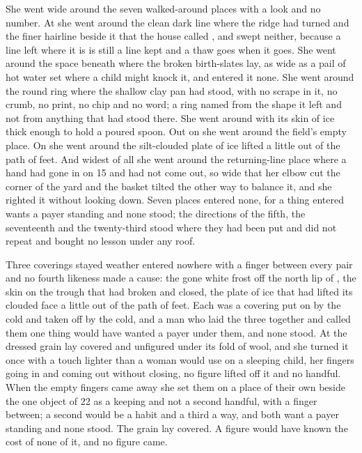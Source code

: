 She went wide around the seven walked-around places with a look and no number. At  she went around the clean dark line where the ridge had turned and the finer hairline beside it that the house called , and swept neither, because a line left where it is is still a line kept and a thaw goes when it goes. She went around the space beneath  where the broken birth-slates lay, as wide as a pail of hot water set where a child might knock it, and entered it none. She went around the round ring where the shallow clay pan had stood, with no scrape in it, no crumb, no print, no chip and no word; a ring named from the shape it left and not from anything that had stood there. She went around  with its skin of ice thick enough to hold a poured spoon. Out on  she went around the field's empty place. On  she went around the silt-clouded plate of ice lifted a little out of the path of feet. And widest of all she went around the returning-line place where a hand had gone in on  15 and had not come out, so wide that her elbow cut the corner of the yard and the basket tilted the other way to balance it, and she righted it without looking down. Seven places entered none, for a thing entered wants a payer standing and none stood; the directions of the fifth, the seventeenth and the twenty-third stood where they had been put and did not repeat and bought no lesson under any roof.

Three coverings stayed weather entered nowhere with a finger between every pair and no fourth likeness made a cause: the gone white frost off the north lip of , the skin on the trough that had broken and closed, the plate of ice that had lifted its clouded face a little out of the path of feet. Each was a covering put on by the cold and taken off by the cold, and a man who laid the three together and called them one thing would have wanted a payer under them, and none stood. At  the dressed grain lay covered and unfigured under its fold of wool, and she turned it once with a touch lighter than a woman would use on a sleeping child, her fingers going in and coming out without closing, no figure lifted off it and no handful. When the empty fingers came away she set them on a place of their own beside the one object of  22 as a keeping and not a second handful, with a finger between; a second would be a habit and a third a way, and both want a payer standing and none stood. The grain lay covered. A figure would have known the cost of none of it, and no figure came.

